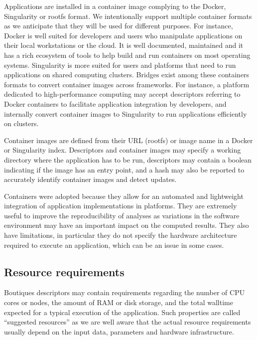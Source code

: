 \documentclass[a4paper,num-refs]{oup-contemporary}
\newcommand{\boutiques}{Boutiques\xspace}
\begin{document}
Applications are installed in a container image complying to the
Docker, Singularity or rootfs format. We intentionally support
multiple container formats as we anticipate that they will be used for
different purposes. For instance, Docker is well suited for developers
and users who manipulate applications on their local workstations or the
cloud. It is well documented, maintained and it has a rich ecosystem of
tools to help build and run containers on most operating systems. Singularity
is more suited for users and platforms that need to run applications
on shared computing clusters. Bridges exist among these containers
formats to convert container images across frameworks. For instance, a
platform dedicated to high-performance computing may accept descriptors
referring to Docker containers to facilitate application integration
by developers, and internally convert container images to Singularity
to run applications efficiently on clusters.

Container images are defined from their URL (rootfs) or image name in
a Docker or Singularity index. Descriptors and container images may
specify a working directory where the application has to be run,
descriptors may contain a boolean indicating if the image has an entry
point, and a hash may also be reported to accurately identify
container images and detect updates.

Containers were adopted because they allow for an automated and
lightweight integration of application implementations in
platforms. They are extremely useful to improve the reproducibility of
analyses as variations in the software environment may have an
important impact on the computed results. They also have limitations,
in particular they do not specify the hardware architecture required
to execute an application, which can be an issue in some cases.


\subsection{Resource requirements}

\boutiques descriptors may contain requirements regarding the number
of CPU cores or nodes, the amount of RAM or disk storage, and the
total walltime expected for a typical execution of the
application. Such properties are called ``suggested resources'' as we
are well aware that the actual resource requirements usually depend on
the input data, parameters and hardware infrastructure.
\end{document}
